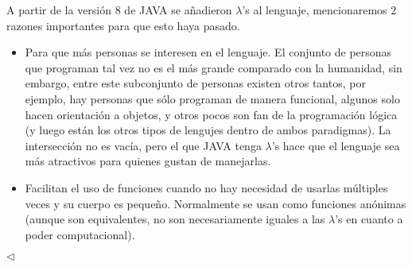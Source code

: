 \begin{enumerate}
A partir de la versión $8$ de JAVA se añadieron $\lambda$'s al lenguaje, mencionaremos $2$
razones importantes para que esto haya pasado.
\begin{itemize}
\item Para que más personas se interesen en el lenguaje. El conjunto de personas que
programan tal vez no es el más grande comparado con la humanidad, sin embargo, entre
este subconjunto de personas existen otros tantos, por ejemplo, hay personas que sólo
programan de manera funcional, algunos solo hacen orientación a objetos, y otros
pocos son fan de la programación lógica (y luego están los otros tipos de lengujes
dentro de ambos paradigmas). La intersección no es vacía, pero el que JAVA tenga
$\lambda$'s hace que el lenguaje sea más atractivos para quienes gustan de manejarlas.

\item Facilitan el uso de funciones cuando no hay necesidad de usarlas múltiples veces
y su cuerpo es pequeño. Normalmente se usan como funciones anónimas (aunque son equivalentes,
no son necesariamente iguales a las $\lambda$'s en cuanto a poder computacional).
\end{itemize}

\hfill $\lhd$
\end{enumerate}
